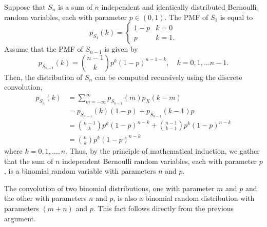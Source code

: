 \begin{example}
Suppose that $S_n$ is a sum of $n$ independent and identically distributed Bernoulli random variables, each with parameter $p \in (0,1)$.
The PMF of $S_1$ is equal to
\begin{equation*}
p_{S_1} (k) = \begin{cases} 1 - p & k = 0 \\
p & k = 1 .  \end{cases}
\end{equation*}
Assume that the PMF of $S_{n-1}$ is given by
\begin{equation*}
p_{S_{n-1}} (k)
= \binom{n-1}{k} p^k (1-p)^{n-1-k} ,
\quad k = 0, 1, \ldots n-1 .
\end{equation*}
Then, the distribution of $S_n$ can be computed recursively using the discrete convolution,
\begin{equation*}
\begin{split}
p_{S_n} (k) &= \sum_{m = - \infty}^{\infty} p_{S_{n-1}}(m) p_X(k-m) \\
&= p_{S_{n-1}}(k) (1-p) + p_{S_{n-1}}(k-1) p \\
&= \binom{n-1}{k} p^{k} (1-p)^{n-k} + \binom{n-1}{k-1} p^{k} (1-p)^{n-k} \\
&= \binom{n}{k} p^{k} (1-p)^{n-k}
\end{split}
\end{equation*}
where $k = 0, 1, \ldots, n$.
Thus, by the principle of mathematical induction, we gather that the sum of $n$ independent Bernoulli random variables, each with parameter $p$, is a binomial random variable with parameters $n$ and $p$.
\end{example}

The convolution of two binomial distributions, one with parameter $m$ and $p$ and the other with parameters $n$ and $p$, is also a binomial random distribution with parameters $(m+n)$ and $p$.
This fact follows directly from the previous argument.

